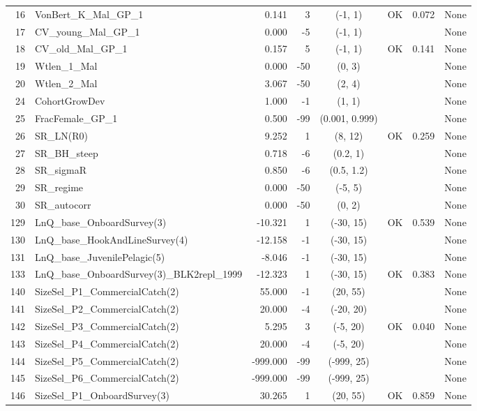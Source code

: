 \documentclass[12pt,]{article}
\begin{document}
\begin{landscape}
\begin{longtable}{rlrrcccl}
  16 & VonBert\_K\_Mal\_GP\_1 & 0.141 & 3 & (-1, 1) & OK & 0.072 & None \\ 
  17 & CV\_young\_Mal\_GP\_1 & 0.000 & -5 & (-1, 1) &  &  & None \\ 
  18 & CV\_old\_Mal\_GP\_1 & 0.157 & 5 & (-1, 1) & OK & 0.141 & None \\ 
  19 & Wtlen\_1\_Mal & 0.000 & -50 & (0, 3) &  &  & None \\ 
  20 & Wtlen\_2\_Mal & 3.067 & -50 & (2, 4) &  &  & None \\ 
  24 & CohortGrowDev & 1.000 & -1 & (1, 1) &  &  & None \\ 
  25 & FracFemale\_GP\_1 & 0.500 & -99 & (0.001, 0.999) &  &  & None \\ 
  26 & SR\_LN(R0) & 9.252 & 1 & (8, 12) & OK & 0.259 & None \\ 
  27 & SR\_BH\_steep & 0.718 & -6 & (0.2, 1) &  &  & None \\ 
  28 & SR\_sigmaR & 0.850 & -6 & (0.5, 1.2) &  &  & None \\ 
  29 & SR\_regime & 0.000 & -50 & (-5, 5) &  &  & None \\ 
  30 & SR\_autocorr & 0.000 & -50 & (0, 2) &  &  & None \\ 
  129 & LnQ\_base\_OnboardSurvey(3) & -10.321 & 1 & (-30, 15) & OK & 0.539 & None \\ 
  130 & LnQ\_base\_HookAndLineSurvey(4) & -12.158 & -1 & (-30, 15) &  &  & None \\ 
  131 & LnQ\_base\_JuvenilePelagic(5) & -8.046 & -1 & (-30, 15) &  &  & None \\ 
  133 & LnQ\_base\_OnboardSurvey(3)\_BLK2repl\_1999 & -12.323 & 1 & (-30, 15) & OK & 0.383 & None \\ 
  140 & SizeSel\_P1\_CommercialCatch(2) & 55.000 & -1 & (20, 55) &  &  & None \\ 
  141 & SizeSel\_P2\_CommercialCatch(2) & 20.000 & -4 & (-20, 20) &  &  & None \\ 
  142 & SizeSel\_P3\_CommercialCatch(2) & 5.295 & 3 & (-5, 20) & OK & 0.040 & None \\ 
  143 & SizeSel\_P4\_CommercialCatch(2) & 20.000 & -4 & (-5, 20) &  &  & None \\ 
  144 & SizeSel\_P5\_CommercialCatch(2) & -999.000 & -99 & (-999, 25) &  &  & None \\ 
  145 & SizeSel\_P6\_CommercialCatch(2) & -999.000 & -99 & (-999, 25) &  &  & None \\ 
  146 & SizeSel\_P1\_OnboardSurvey(3) & 30.265 & 1 & (20, 55) & OK & 0.859 & None \\ 

\end{longtable}
\end{landscape}
\end{document}
